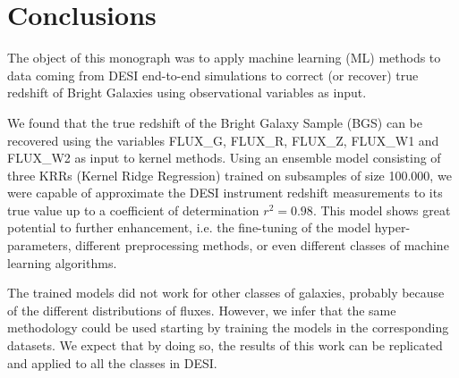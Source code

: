 \chapter{Conclusions}
\label{Ch:conclusion}

The object of this monograph was to apply machine learning (ML) methods to data coming from DESI end-to-end simulations to correct (or recover) true redshift of Bright Galaxies using observational variables as input. 

We found that the true redshift of the Bright Galaxy Sample (BGS) can be recovered using the variables FLUX\_G, FLUX\_R, FLUX\_Z, FLUX\_W1 and FLUX\_W2 as input to kernel methods. Using an ensemble model consisting of three KRRs (Kernel Ridge Regression) trained on subsamples of size 100.000, we were capable of approximate the DESI instrument redshift measurements to its true value up to a coefficient of determination $r^2 = 0.98$.  This model shows great potential to further enhancement, i.e. the fine-tuning of the model hyper-parameters, different preprocessing methods, or even different classes of machine learning algorithms.

The trained models did not work for other classes of galaxies, probably because of the different distributions of fluxes. However, we infer that the same methodology could be used starting by training the models in the corresponding datasets. We expect that by doing so, the results of this work can be replicated and applied to all the classes in DESI. 